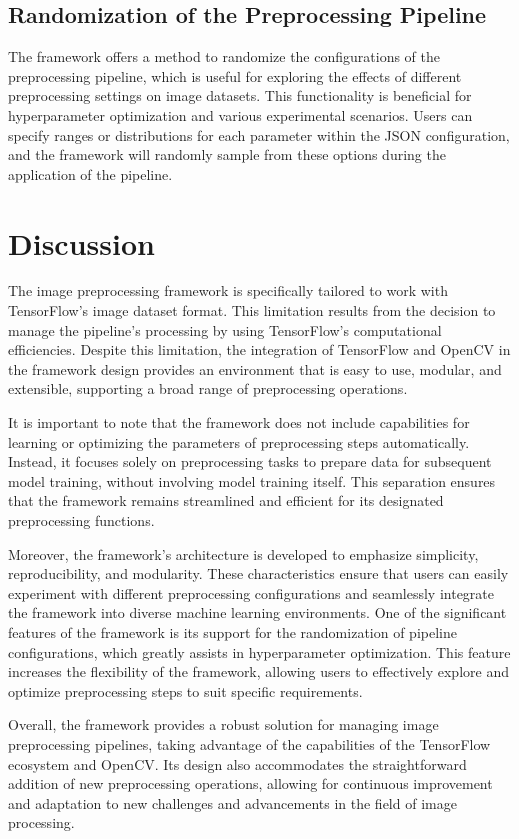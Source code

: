 \documentclass[journal]{new-aiaa}
\begin{document}
\subsection{Randomization of the Preprocessing Pipeline}
The framework offers a method to randomize the configurations of the preprocessing pipeline, which is useful for exploring the effects of different preprocessing settings on image datasets. This functionality is beneficial for hyperparameter optimization and various experimental scenarios. Users can specify ranges or distributions for each parameter within the JSON configuration, and the framework will randomly sample from these options during the application of the pipeline.


\section{Discussion}
The image preprocessing framework is specifically tailored to work with TensorFlow's image dataset format. This limitation results from the decision to manage the pipeline's processing by using TensorFlow's computational efficiencies. Despite this limitation, the integration of TensorFlow and OpenCV in the framework design provides an environment that is easy to use, modular, and extensible, supporting a broad range of preprocessing operations.

It is important to note that the framework does not include capabilities for learning or optimizing the parameters of preprocessing steps automatically. Instead, it focuses solely on preprocessing tasks to prepare data for subsequent model training, without involving model training itself. This separation ensures that the framework remains streamlined and efficient for its designated preprocessing functions.

Moreover, the framework's architecture is developed to emphasize simplicity, reproducibility, and modularity. These characteristics ensure that users can easily experiment with different preprocessing configurations and seamlessly integrate the framework into diverse machine learning environments. One of the significant features of the framework is its support for the randomization of pipeline configurations, which greatly assists in hyperparameter optimization. This feature increases the flexibility of the framework, allowing users to effectively explore and optimize preprocessing steps to suit specific requirements.

Overall, the framework provides a robust solution for managing image preprocessing pipelines, taking advantage of the capabilities of the TensorFlow ecosystem and OpenCV. Its design also accommodates the straightforward addition of new preprocessing operations, allowing for continuous improvement and adaptation to new challenges and advancements in the field of image processing.





\end{document}
